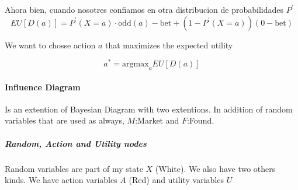 Ahora bien, cuando nosotres confiamos en otra distribucion de probabilidades $P^\prime$
\begin{equation}
EU[D(a)] = P^\prime(X=a) \cdot \text{odd}(a) - \text{bet} + \left( 1 - P^\prime(X=a) \right) \left( 0 - \text{bet} \right) 
\end{equation}

\vspace{0.3cm}

We want to chosse action $a$ that maximizes the expected utility

\begin{equation}
 a^* = \text{argmax}_a EU[D(a)]
\end{equation}

\paragraph{Influence Diagram}

Is an extention of Bayesian Diagram with two extentions.
In addition of random variables that are used as always, $M$:Market and $F$:Found.

\subparagraph{Random, Action and Utility nodes}

Random variables are part of my state $X$ (White).
We also have two others kinds. 
We have action variables $A$ (Red) and utility variables $U$  

\begin{center}
\end{center}

